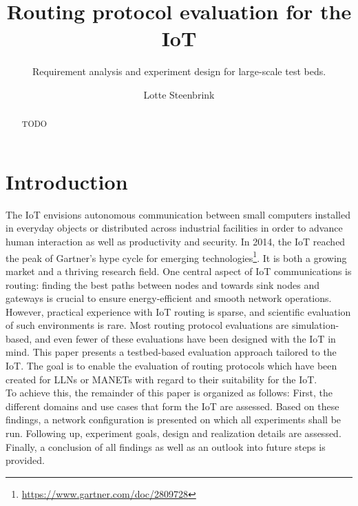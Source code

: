 \documentclass{acm_proc_article-sp}
\begin{document}
\title{Routing protocol evaluation for the IoT}
\subtitle{Requirement analysis and experiment design for large-scale test beds.}

\author{
\alignauthor
Lotte Steenbrink
}

\maketitle
\begin{abstract}
TODO
\end{abstract}


\section{Introduction}
\label{sec:Intro}
The \gls{IoT} envisions autonomous communication between small computers installed in everyday objects or distributed across industrial facilities in order to advance human interaction as well as productivity and security.
In 2014, the \gls{IoT} reached the peak of Gartner's hype cycle for emerging technologies\footnote{ \url{https://www.gartner.com/doc/2809728}}. It is both a growing market and a thriving research field. One central aspect of IoT communications is routing: finding the best paths between nodes and towards sink nodes and gateways is crucial to ensure energy-efficient and smooth network operations. However, practical experience with IoT routing is sparse, and scientific evaluation of such environments is rare. Most routing protocol evaluations are simulation-based, and even fewer of these evaluations have been designed with the IoT in mind.
This paper presents a testbed-based evaluation approach tailored to the IoT. The goal is to enable the evaluation of routing protocols which have been created for \glspl{LLN} or \glspl{MANET} with regard to their suitability for the IoT.\\
To achieve this, the remainder of this paper is organized as follows:
First, the different domains and use cases that form the IoT are assessed. Based on these findings, a network configuration is presented on which all experiments shall be run. Following up, experiment goals, design and realization details are assessed. Finally, a conclusion of all findings as well as an outlook into future steps is provided.
\end{document}
